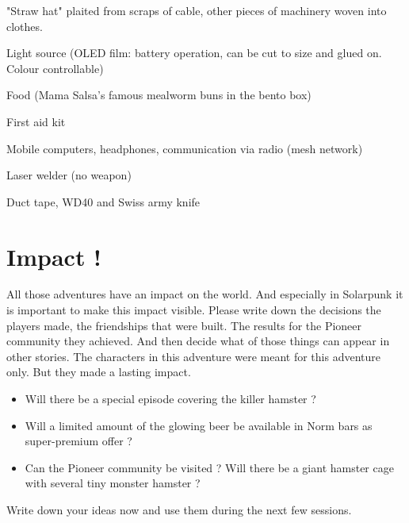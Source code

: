 \begin{npcBox}[title=Spark]
    \begin{stressSection}
    \end{stressSection}
    \begin{tabularx}{\textwidth}{ XX }
    \end{tabularx}

    \begin{consequences}
    \item {}
    \item {}
    \item {}
    \end{consequences}

    \begin{npcDescription}
    "Straw hat" plaited from scraps of cable, other pieces of machinery woven into clothes.
    \end{npcDescription}


    \begin{equipment}
    \item Light source (OLED film: battery operation, can be cut to size and glued on. Colour controllable)
    \item Food (Mama Salsa's famous mealworm buns in the bento box)
    \item First aid kit
    \item Mobile computers, headphones, communication via radio (mesh network)
    \item Laser welder (no weapon)
    \item Duct tape, WD40 and Swiss army knife
    \end{equipment}
\end{npcBox}

\newpage

\section{Impact !}

All those adventures have an impact on the world. And especially in Solarpunk it is important to make this impact visible. Please write down the decisions the players made, the friendships that were built. The results for the Pioneer community they achieved. And then decide what of those things can appear in other stories.
The characters in this adventure were meant for this adventure only. But they made a lasting impact.

\begin{itemize}
    \item Will there be a special episode covering the killer hamster ?
    \item Will a limited amount of the glowing beer be available in Norm bars as super-premium offer ?
    \item Can the Pioneer community be visited ? Will there be a giant hamster cage with several tiny monster hamster ?
\end{itemize}

Write down your ideas now and use them during the next few sessions.
